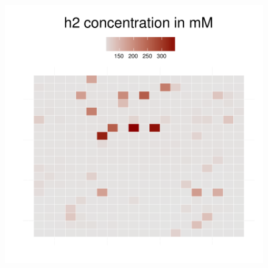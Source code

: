 \begin{figure}[h!]
{\begin{minipage}[t]{0.3\textwidth}
  \end{minipage}
  \begin{minipage}[t]{0.3\textwidth}
    \includegraphics[width=\textwidth]{../results/ecoli_beijerinckii_20x20_seed5147_h275.pdf}
  \end{minipage}
  }
\end{figure}
